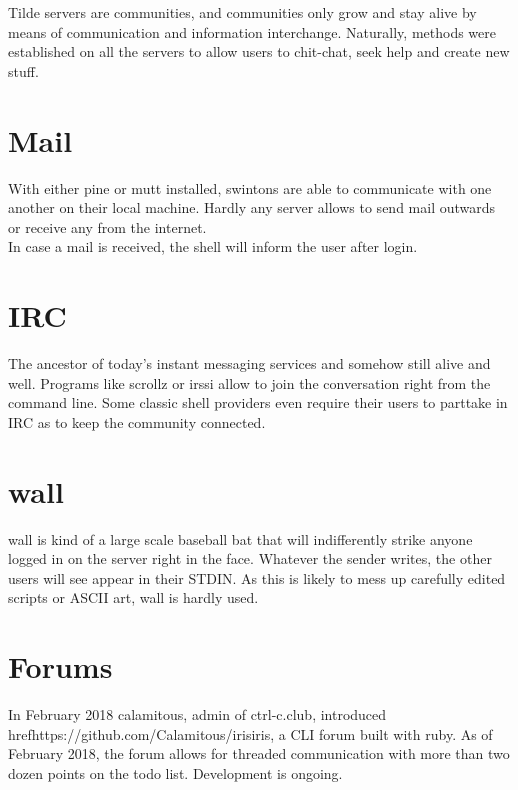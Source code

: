 Tilde servers are communities, and communities only grow and stay alive by means of communication and information interchange. Naturally, methods were established on all the servers to allow users to chit-chat, seek help and create new stuff.

\section{Mail}
With either pine or mutt installed, swintons are able to communicate with one another on their local machine. Hardly any server allows to send mail outwards or receive any from the internet.\\
In case a mail is received, the shell will inform the user after login.

\section{IRC}
The ancestor of today's instant messaging services and somehow still alive and well. Programs like scrollz or irssi allow to join the conversation right from the command line. Some classic shell providers even require their users to parttake in IRC as to keep the community connected.

\section{wall}
wall is kind of a large scale baseball bat that will indifferently strike anyone logged in on the server right in the face. Whatever the sender writes, the other users will see appear in their STDIN. As this is likely to mess up carefully edited scripts or ASCII art, wall is hardly used.

\section{Forums}
In February 2018 calamitous, admin of ctrl-c.club, introduced href{https://github.com/Calamitous/iris}{iris}, a CLI forum built with ruby. As of February 2018, the forum allows for threaded communication with more than two dozen points on the todo list. Development is ongoing.
